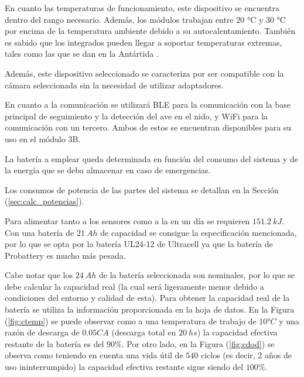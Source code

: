 En cuanto las temperaturas de funcionamiento, este dispositivo se encuentra dentro del rango necesario. Además, los módulos \rspi trabajan entre 20 °C y 30 °C por encima de la temperatura ambiente debido a su autocalentamiento. También es sabido que los integrados \rpi pueden llegar a soportar temperaturas extremas, tales como las que se dan en la Antártida \cite{ref:Penguin}.

Además, este dispositivo seleccionado se caracteriza por ser compatible con la cámara seleccionada sin la necesidad de utilizar adaptadores.


En cuanto a la comunicación se utilizará BLE para la comunicación con la base principal de seguimiento y la detección del ave en el nido, y WiFi para la comunicación con un tercero.
Ambos de estos se encuentran disponibles para su uso en el módulo \rspi 3B.



La batería a emplear queda determinada en función del consumo del sistema y de la energía que se deba almacenar en caso de emergencias. 

Los consumos de potencia de las partes del sistema se detallan en la Sección (\ref{sec:calc_potencias}).

Para alimentar tanto a los sensores como a la \rpi en un día se requieren $151.2 \ kJ$. Con una batería de $21 \ Ah$ de capacidad se consigue la especificación mencionada, por lo que se opta por la batería UL24-12 de Ultracell ya que la batería de Probattery es mucho más pesada.

Cabe notar que los $24 \ Ah$ de la batería seleccionada son nominales, por lo que se debe calcular la capacidad real (la cual será ligeramente menor debido a condiciones del entorno y calidad de esta). Para obtener la capacidad real de la batería se utiliza la información proporcionada en la hoja de datos. En la Figura (\ref{fig:ctemp}) se puede observar como a una temperatura de trabajo de $10°C$ y una razón de descarga de $0.05CA$ (descarga total en $20 \ hs$) la capacidad efectiva restante de la batería es del $90\% $. Por otro lado, en la Figura (\ref{fig:cdod}) se observa como teniendo en cuenta una vida útil de $540$ ciclos (es decir, 2 años de uso ininterrumpido) la capacidad efectiva restante sigue siendo del $100\%$.
 

